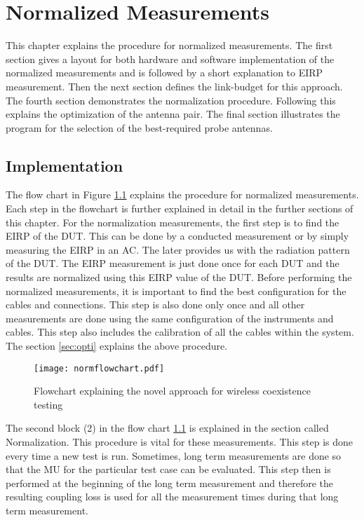 \chapter{Normalized Measurements}\label{chap:normalized}
This chapter explains the procedure for normalized measurements. The first section gives a layout for both hardware and software implementation of the normalized measurements and is followed by a short explanation to \acs{EIRP} measurement. Then the next section defines the link-budget for this approach. The fourth section demonstrates the normalization procedure. Following this explains the optimization of the antenna pair. The final section illustrates the program for the selection of the best-required probe antennas.


\section{Implementation}
The flow chart in Figure \ref{fig:1} explains the procedure for normalized measurements. Each step in the flowchart is further explained in detail in the further sections of this chapter. For the normalization measurements, the first step is to find the \acs{EIRP} of the \acs{DUT}. This can be done by a conducted measurement or by simply measuring the \acs{EIRP} in an \acf{AC}. The later provides us with the radiation pattern of the \acs{DUT}.  The \acs{EIRP} measurement is just done once for each \acs{DUT} and the results are normalized using this \acs{EIRP} value of the \acs{DUT}. Before performing the normalized measurements, it is important to find the best configuration for the cables and connections. This step is also done only once and all other measurements are done using the same configuration of the instruments and cables. This step also includes the calibration of all the cables within the system.  The section \ref{sec:opti} explains the above procedure.

\begin{figure}[H]
\centering
\texttt{[image: normflowchart.pdf]}
\vspace{-0.5cm} \caption{Flowchart explaining the novel approach for wireless coexistence testing}
\label{fig:1} 
\end{figure}

The second block (2) in the flow chart \ref{fig:1} is explained in the section called Normalization. This procedure is vital for these measurements. This step is done every time a new test is run. Sometimes, long term measurements are done so that the \acf{MU} for the particular test case can be evaluated. This step then is performed at the beginning of the long term measurement and therefore the resulting coupling loss is used for all the measurement times during that long term measurement. \\
 
